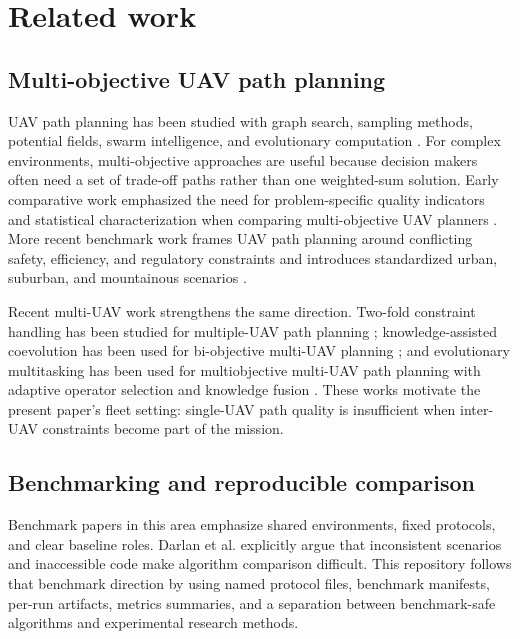 \documentclass[a4paper,fleqn]{cas-dc}
\begin{document}
\section{Related work}
\label{sec:related-work}

\subsection{Multi-objective UAV path planning}

UAV path planning has been studied with graph search, sampling methods, potential fields, swarm intelligence, and evolutionary computation \cite{jiang2024ec_uav_survey}. For complex environments, multi-objective approaches are useful because decision makers often need a set of trade-off paths rather than one weighted-sum solution. Early comparative work emphasized the need for problem-specific quality indicators and statistical characterization when comparing multi-objective UAV planners \cite{besada2013uav_comparison}. More recent benchmark work frames UAV path planning around conflicting safety, efficiency, and regulatory constraints and introduces standardized urban, suburban, and mountainous scenarios \cite{darlan2025benchmark}.

Recent multi-UAV work strengthens the same direction. Two-fold constraint handling has been studied for multiple-UAV path planning \cite{zhang2024twofold_uav}; knowledge-assisted coevolution has been used for bi-objective multi-UAV planning \cite{zhou2024tskac}; and evolutionary multitasking has been used for multiobjective multi-UAV path planning with adaptive operator selection and knowledge fusion \cite{meng2025emmop}. These works motivate the present paper's fleet setting: single-UAV path quality is insufficient when inter-UAV constraints become part of the mission.

\subsection{Benchmarking and reproducible comparison}

Benchmark papers in this area emphasize shared environments, fixed protocols, and clear baseline roles. Darlan et al. \cite{darlan2025benchmark} explicitly argue that inconsistent scenarios and inaccessible code make algorithm comparison difficult. This repository follows that benchmark direction by using named protocol files, benchmark manifests, per-run artifacts, metrics summaries, and a separation between benchmark-safe algorithms and experimental research methods.
\end{document}
